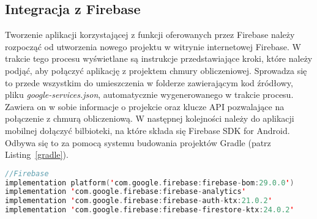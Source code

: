 \newpage
    \subsection{Integracja z Firebase}
    Tworzenie aplikacji korzystającej z funkcji oferowanych przez Firebase należy rozpocząć od utworzenia nowego projektu w witrynie internetowej Firebase. W trakcie tego procesu wyświetlane są instrukcje
    przedstawiające kroki, które należy podjąć, aby połączyć aplikację z projektem chmury obliczeniowej. Sprowadza się to przede wszystkim do umieszczenia w folderze zawierającym kod źródłowy, pliku
    \emph{google-services.json}, automatycznie wygenerowanego w trakcie procesu. Zawiera on w sobie informacje o projekcie oraz klucze API pozwalające na połączenie z chmurą obliczeniową. 
    W następnej kolejności należy do aplikacji mobilnej dołączyć bilbioteki, na które składa się Firebase SDK for Android. Odbywa się to za pomocą systemu budowania projektów Gradle (patrz Listing~\ref{gradle}).

    \vspace{1cm}
    \begin{lstlisting}[language=Kotlin, caption=Biblioteki Firebase SDK zaimplementowane w aplikacji, label=gradle]
//Firebase
implementation platform('com.google.firebase:firebase-bom:29.0.0')
implementation 'com.google.firebase:firebase-analytics'
implementation 'com.google.firebase:firebase-auth-ktx:21.0.2'
implementation 'com.google.firebase:firebase-firestore-ktx:24.0.2'
    \end{lstlisting}
    \vspace{1cm}

